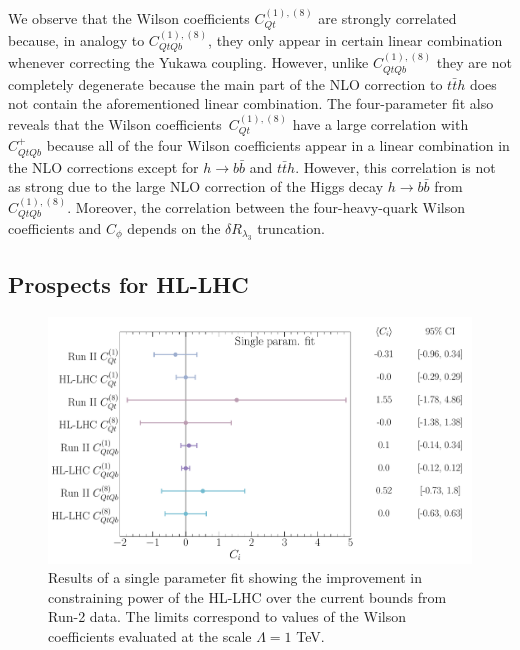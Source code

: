 We observe that the Wilson coefficients $C_{Qt}^{(1),(8) }$ are strongly correlated because, in analogy to $C_{QtQb}^{(1),(8) }$, they only appear in certain linear combination whenever correcting the Yukawa coupling. However,  unlike $C_{QtQb}^{(1),(8) }$ they are not completely degenerate because the main part of the NLO correction to $t\bar t h$ does not contain the aforementioned linear combination.  The four-parameter fit also reveals that the Wilson coefficients~$C_{Qt}^{(1),(8) }$ have a large correlation with ~$C_{QtQb}^{+}$ because all of the four Wilson coefficients appear in a linear combination in the NLO corrections except for $ h\to b\bar b$ and $ t\bar{t} h$. However, this correlation is not as strong due to the large NLO correction of the Higgs decay $h \to b \bar b$ from ~$C_{QtQb}^{(1),(8) }$. Moreover, the correlation between the four-heavy-quark Wilson coefficients  and $C_{\phi}$ depends on the $\delta R_{\lambda_3}$ truncation. 
\subsection{Prospects for HL-LHC}
\begin{figure}[t!]
	\begin{center}
		\includegraphics[width=0.75\linewidth]{fig/uebeblick_forest_ci}
	\end{center}
	\caption{ Results of a single parameter fit showing the improvement in constraining power of the HL-LHC over the current bounds from Run-2 data. The limits correspond to values of the Wilson coefficients evaluated at the scale $\Lambda=1$ TeV. \label{fig:HLLHC} }
\end{figure}

